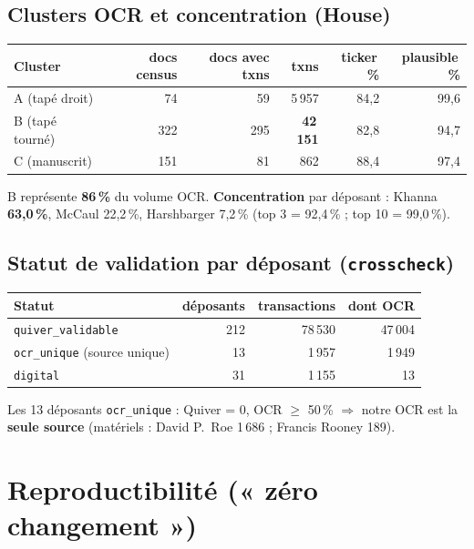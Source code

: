 \documentclass[11pt,a4paper]{article}
\newcommand{\code}[1]{\texttt{\small #1}}
\begin{document}
\subsection{Clusters OCR et concentration (House)}

\begin{center}\small
\begin{tabular}{@{}lrrrrr@{}}
\toprule
\textbf{Cluster} & \textbf{docs census} & \textbf{docs avec txns} & \textbf{txns} & \textbf{ticker\,\%} & \textbf{plausible\,\%}\\
\midrule
A (tapé droit) & 74 & 59 & 5\,957 & 84,2 & 99,6 \\
B (tapé tourné) & 322 & 295 & \textbf{42\,151} & 82,8 & 94,7 \\
C (manuscrit) & 151 & 81 & 862 & 88,4 & 97,4 \\
\bottomrule
\end{tabular}
\end{center}

B représente \textbf{86\,\%} du volume OCR. \textbf{Concentration} par déposant : Khanna \textbf{63,0\,\%},
McCaul 22,2\,\%, Harshbarger 7,2\,\% (top 3 = 92,4\,\% ; top 10 = 99,0\,\%).

\subsection{Statut de validation par déposant (\code{crosscheck})}

\begin{center}\small
\begin{tabular}{@{}lrrr@{}}
\toprule
\textbf{Statut} & \textbf{déposants} & \textbf{transactions} & \textbf{dont OCR}\\
\midrule
\code{quiver\_validable} & 212 & 78\,530 & 47\,004 \\
\code{ocr\_unique} (source unique) & 13 & 1\,957 & 1\,949 \\
\code{digital} & 31 & 1\,155 & 13 \\
\bottomrule
\end{tabular}
\end{center}

Les 13 déposants \code{ocr\_unique} : Quiver = 0, OCR $\geq$ 50\,\% $\Rightarrow$ notre OCR est la
\textbf{seule source} (matériels : David P.\ Roe 1\,686 ; Francis Rooney 189).

\section{Reproductibilité (« zéro changement »)}
\end{document}
